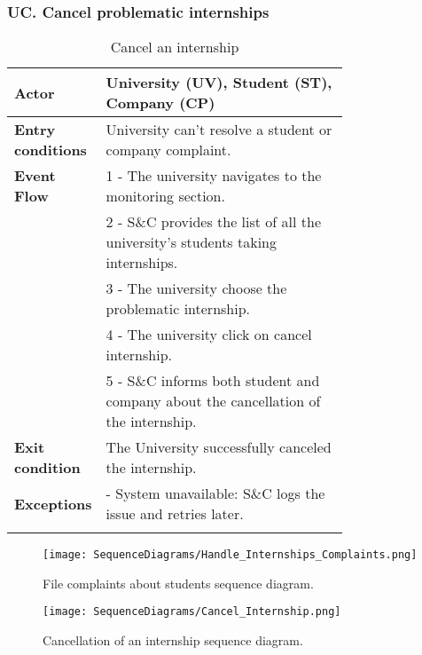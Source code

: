 \subsubsection*{UC\cuc . Cancel problematic internships}
\begin{center}
    \begin{longtable}{|l|p{0.75\linewidth}|}
        \hline
        \textbf{Actor}            & University (UV), Student (ST), Company (CP) \\
        \hline
        \textbf{Entry conditions} & University can't resolve a student or company complaint. \\
        \hline
        \textbf{Event Flow}       & 1 - The university navigates to the monitoring section. \\
        & 2 - S\&C provides the list of all the university’s students taking
internships. \\
        & 3 - The university choose the problematic internship. \\
        & 4 - The university click on cancel internship. \\
        & 5 - S\&C informs both student and company about the cancellation of the internship. \\
        \hline
        \textbf{Exit condition}   & The University successfully canceled the internship. \\       
        \hline
        \textbf{Exceptions}       & - System unavailable: S\&C logs the issue and retries later. \\
        \hline
        \caption{Cancel an internship}
        \label{tab:cancel_internships_usecase}
    \end{longtable}
\end{center}

\begin{figure}[H]
    \begin{center}
        \texttt{[image: SequenceDiagrams/Handle\_Internships\_Complaints.png]}
        \caption{File complaints about students sequence diagram.}
        \label{fig:handle_internships_complaints_seqd}%
    \end{center}
\end{figure}

\begin{figure}[H]
    \begin{center}
        \texttt{[image: SequenceDiagrams/Cancel\_Internship.png]}
        \caption{Cancellation of an internship sequence diagram.}
        \label{fig:cancel_internship_seqd}%
    \end{center}
\end{figure}


